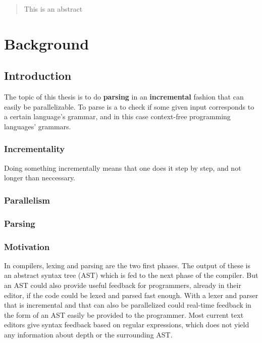 \documentclass[a4paper,12pt,twosided]{report}
\begin{document}


\begin{abstract}
This is an abstract
\end{abstract}

\tableofcontents

%
%

\chapter{Background}

\section{Introduction}
The topic of this thesis is to do \textbf{parsing} in an \textbf{incremental}
fashion that can easily be parallelizable. To parse is a to check if some given
input corresponds to a certain language's grammar, and in this case context-free
programming languages' grammars.

\subsection{Incrementality}
Doing something incrementally means that one does it step by step, and not
longer than neccessary.

\subsection{Parallelism}
\subsection{Parsing}
\subsection{Motivation}
In compilers, lexing and parsing are the two first phases. The output of these
is an abstract syntax tree (AST) which is fed to the next phase of the compiler.
But an AST could also provide useful feedback for programmers, already in their
editor, if the code could be lexed and parsed fast enough. With a lexer and
parser that is incremental and that can also be parallelized could real-time
feedback in the form of an AST easily be provided to the programmer. Most
current text editors give syntax feedback based on regular expressions, which
does not yield any information about depth or the surrounding AST.
\end{document}
